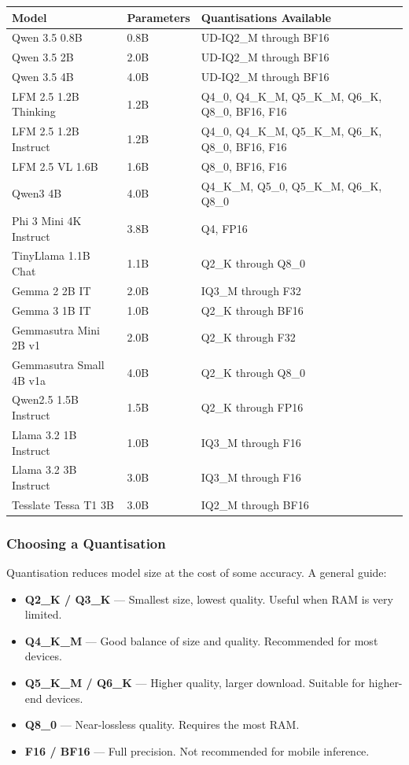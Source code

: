 \documentclass[12pt,a4paper]{article}
\begin{document}
\begin{center}
\begin{tabular}{lll}
\toprule
\textbf{Model} & \textbf{Parameters} & \textbf{Quantisations Available} \\
\midrule
Qwen 3.5 0.8B              & 0.8B & UD-IQ2\_M through BF16 \\
Qwen 3.5 2B                & 2.0B & UD-IQ2\_M through BF16 \\
Qwen 3.5 4B                & 4.0B & UD-IQ2\_M through BF16 \\
LFM 2.5 1.2B Thinking      & 1.2B & Q4\_0, Q4\_K\_M, Q5\_K\_M, Q6\_K, Q8\_0, BF16, F16 \\
LFM 2.5 1.2B Instruct      & 1.2B & Q4\_0, Q4\_K\_M, Q5\_K\_M, Q6\_K, Q8\_0, BF16, F16 \\
LFM 2.5 VL 1.6B            & 1.6B & Q8\_0, BF16, F16 \\
Qwen3 4B                   & 4.0B & Q4\_K\_M, Q5\_0, Q5\_K\_M, Q6\_K, Q8\_0 \\
Phi 3 Mini 4K Instruct     & 3.8B & Q4, FP16 \\
TinyLlama 1.1B Chat        & 1.1B & Q2\_K through Q8\_0 \\
Gemma 2 2B IT              & 2.0B & IQ3\_M through F32 \\
Gemma 3 1B IT              & 1.0B & Q2\_K through BF16 \\
Gemmasutra Mini 2B v1      & 2.0B & Q2\_K through F32 \\
Gemmasutra Small 4B v1a    & 4.0B & Q2\_K through Q8\_0 \\
Qwen2.5 1.5B Instruct      & 1.5B & Q2\_K through FP16 \\
Llama 3.2 1B Instruct      & 1.0B & IQ3\_M through F16 \\
Llama 3.2 3B Instruct      & 3.0B & IQ3\_M through F16 \\
Tesslate Tessa T1 3B       & 3.0B & IQ2\_M through BF16 \\
\bottomrule
\end{tabular}
\end{center}

\subsubsection{Choosing a Quantisation}

Quantisation reduces model size at the cost of some accuracy. A general guide:

\begin{itemize}[noitemsep]
    \item \textbf{Q2\_K / Q3\_K} — Smallest size, lowest quality. Useful when RAM is very limited.
    \item \textbf{Q4\_K\_M} — Good balance of size and quality. Recommended for most devices.
    \item \textbf{Q5\_K\_M / Q6\_K} — Higher quality, larger download. Suitable for higher-end devices.
    \item \textbf{Q8\_0} — Near-lossless quality. Requires the most RAM.
    \item \textbf{F16 / BF16} — Full precision. Not recommended for mobile inference.
\end{itemize}
\end{document}
